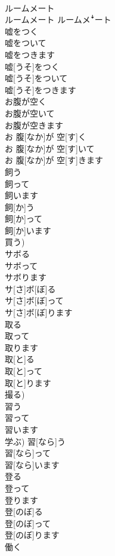 \documentclass[8pt]{extreport}
\begin{document}
\begin{CJK}{UTF8}{min}
\\	ルームメート	
\\	ルームメート	ルームメꜜート
\\	嘘をつく 
\\	嘘をついて 
\\	嘘をつきます	
\\	嘘[うそ]をつく 
\\	嘘[うそ]をついて 
\\	嘘[うそ]をつきます	
\\	お腹が空く 
\\	お腹が空いて 
\\	お腹が空きます	
\\	お 腹[なか]が 空[す]く 
\\	お 腹[なか]が 空[す]いて 
\\	お 腹[なか]が 空[す]きます	
\\	飼う 
\\	飼って 
\\	飼います	
\\	飼[か]う 
\\	飼[か]って 
\\	飼[か]います 
\\	買う)	
\\	サボる 
\\	サボって 
\\	サボります	
\\	サ[さ]ボ[ぼ]る 
\\	サ[さ]ボ[ぼ]って 
\\	サ[さ]ボ[ぼ]ります	
\\	取る 
\\	取って 
\\	取ります	
\\	取[と]る 
\\	取[と]って 
\\	取[と]ります 
\\	撮る)	
\\	習う 
\\	習って 
\\	習います	
\\	学ぶ)	習[なら]う 
\\	習[なら]って 
\\	習[なら]います	
\\	登る 
\\	登って 
\\	登ります	
\\	登[のぼ]る 
\\	登[のぼ]って 
\\	登[のぼ]ります	
\\	働く 

\end{CJK}
\end{document}
